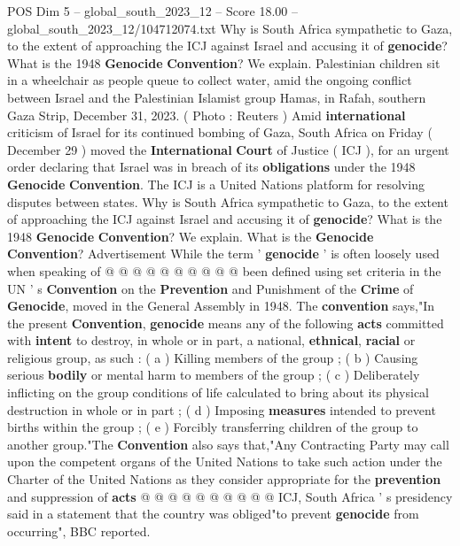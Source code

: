 \begin{textsample}{POS Dim 5 – global\_south\_2023\_12 – Score 18.00 – global\_south\_2023\_12/104712074.txt}  \label{ex:f5_pos_105}
Why is South Africa sympathetic to Gaza, to the extent of approaching the ICJ against Israel and accusing it of \textbf{genocide}?
What is the 1948 \textbf{Genocide} \textbf{Convention}?
We explain.
Palestinian children sit in a wheelchair as people queue to collect water, amid the ongoing conflict between Israel and the Palestinian Islamist group Hamas, in Rafah, southern Gaza Strip, December 31, 2023. ( Photo : Reuters ) Amid \textbf{international} criticism of Israel for its continued bombing of Gaza, South Africa on Friday ( December 29 ) moved the \textbf{International} \textbf{Court} of Justice ( ICJ ), for an urgent order declaring that Israel was in breach of its \textbf{obligations} under the 1948 \textbf{Genocide} \textbf{Convention}.
The ICJ is a United Nations platform for resolving disputes between states.
Why is South Africa sympathetic to Gaza, to the extent of approaching the ICJ against Israel and accusing it of \textbf{genocide}?
What is the 1948 \textbf{Genocide} \textbf{Convention}?
We explain.
What is the \textbf{Genocide} \textbf{Convention}?
Advertisement While the term ' \textbf{genocide} ' is often loosely used when speaking of @ @ @ @ @ @ @ @ @ @ been defined using set criteria in the UN ' s \textbf{Convention} on the \textbf{Prevention} and Punishment of the \textbf{Crime} of \textbf{Genocide}, moved in the General Assembly in 1948.
The \textbf{convention} says,"In the present \textbf{Convention}, \textbf{genocide} means any of the following \textbf{acts} committed with \textbf{intent} to destroy, in whole or in part, a national, \textbf{ethnical}, \textbf{racial} or religious group, as such : ( a ) Killing members of the group ; ( b ) Causing serious \textbf{bodily} or mental harm to members of the group ; ( c ) Deliberately inflicting on the group conditions of life calculated to bring about its physical destruction in whole or in part ; ( d ) Imposing \textbf{measures} intended to prevent births within the group ; ( e ) Forcibly transferring children of the group to another group."The \textbf{Convention} also says that,"Any Contracting Party may call upon the competent organs of the United Nations to take such action under the Charter of the United Nations as they consider appropriate for the \textbf{prevention} and suppression of \textbf{acts} @ @ @ @ @ @ @ @ @ @ ICJ, South Africa ' s presidency said in a statement that the country was obliged"to prevent \textbf{genocide} from occurring", BBC reported.

\end{textsample}
